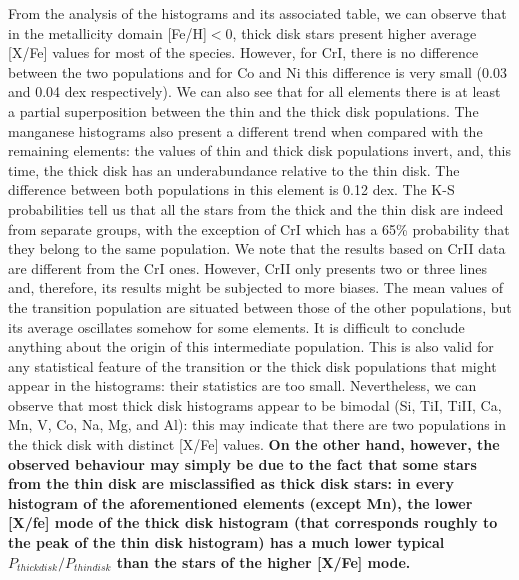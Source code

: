 \documentclass[oldversion]{aa}
\begin{document}
From the analysis of the histograms and its associated table, we can observe that in the metallicity domain [Fe/H]$<$0, thick disk stars present higher average [X/Fe] values for most of the species. However, for CrI, there is no difference between the two populations and for Co and Ni this difference is very small (0.03 and 0.04 dex respectively). We can also see that for all elements there is at least a partial superposition between the thin and the thick disk populations. The manganese histograms also present a different trend when compared with the remaining elements: the values of thin and thick disk populations invert, and, this time, the thick disk has an underabundance relative to the thin disk.
The difference between both populations in this element is 0.12 dex. The K-S probabilities tell us that all the stars from the thick and the thin disk are indeed from separate groups, with the exception of CrI which has a 65\% probability that they belong to the same population. We note that the results based on CrII data are different from the CrI ones. However, CrII only presents two or three lines and, therefore, its results might be subjected to more biases. The mean values of the transition population are situated between those of the other populations, but its average oscillates somehow for some elements. It is difficult to conclude anything about the origin of this intermediate population. This is also valid for any statistical feature of the transition or the thick disk populations that might appear in the histograms: their statistics are too small. Nevertheless, we can observe that most thick disk histograms appear to be bimodal (Si, TiI, TiII, Ca, Mn, V, Co, Na, Mg, and Al): this may indicate that there are two populations in the thick disk with distinct [X/Fe] values. \textbf{On the other hand, however, the observed behaviour may simply be due to the fact that some stars from the thin disk are misclassified as thick disk stars: in every histogram of the aforementioned elements (except Mn), the lower [X/fe] mode of the thick disk histogram (that  corresponds roughly to the peak of the thin disk histogram) has a much lower typical $P_{thick disk}/P_{thin disk}$ than the stars of the higher [X/Fe] mode.}

\end{document}
